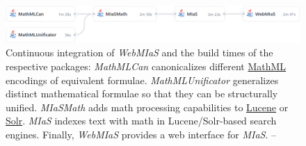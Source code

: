 \begin{figure}
\vspace*{0.2cm}
\includegraphics{continuous-integration-dependency-tree}
\caption{Continuous integration of \emph{WebMIaS} and the build
         times of the respective packages: \emph{MathMLCan} canonicalizes
         different \href{https://www.w3.org/TR/MathML3/}{MathML} encodings
         of equivalent formulae. \emph{MathMLUnificator} generalizes
         distinct mathematical formulae so that they can be structurally
         unified. \emph{MIaSMath} adds math processing capabilities to
         \href{https://lucene.apache.org/}{Lucene} or
         \href{https://solr.apache.org/}{Solr}. \emph{MIaS} indexes text
         with math in Lucene/Solr-based search engines.
         Finally, \emph{WebMIaS} provides a web interface for \emph{MIaS}. -- \textcite[Figure 3]{luptak2021webmias}}
\end{figure}